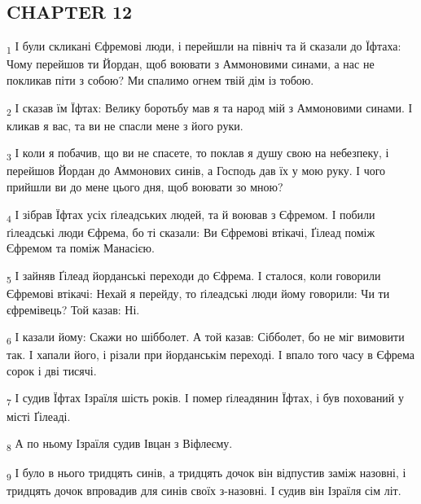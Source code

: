 \subsection{CHAPTER 12}
\begin{tcolorbox}
\textsubscript{1} І були скликані Єфремові люди, і перейшли на північ та й сказали до Їфтаха: Чому перейшов ти Йордан, щоб воювати з Аммоновими синами, а нас не покликав піти з собою? Ми спалимо огнем твій дім із тобою.
\end{tcolorbox}
\begin{tcolorbox}
\textsubscript{2} І сказав їм Їфтах: Велику боротьбу мав я та народ мій з Аммоновими синами. І кликав я вас, та ви не спасли мене з його руки.
\end{tcolorbox}
\begin{tcolorbox}
\textsubscript{3} І коли я побачив, що ви не спасете, то поклав я душу свою на небезпеку, і перейшов Йордан до Аммонових синів, а Господь дав їх у мою руку. І чого прийшли ви до мене цього дня, щоб воювати зо мною?
\end{tcolorbox}
\begin{tcolorbox}
\textsubscript{4} І зібрав Їфтах усіх ґілеадських людей, та й воював з Єфремом. І побили ґілеадські люди Єфрема, бо ті сказали: Ви Єфремові втікачі, Ґілеад поміж Єфремом та поміж Манасією.
\end{tcolorbox}
\begin{tcolorbox}
\textsubscript{5} І зайняв Ґілеад йорданські переходи до Єфрема. І сталося, коли говорили Єфремові втікачі: Нехай я перейду, то ґілеадські люди йому говорили: Чи ти єфремівець? Той казав: Ні.
\end{tcolorbox}
\begin{tcolorbox}
\textsubscript{6} І казали йому: Скажи но шібболет. А той казав: Сібболет, бо не міг вимовити так. І хапали його, і різали при йорданськім переході. І впало того часу в Єфрема сорок і дві тисячі.
\end{tcolorbox}
\begin{tcolorbox}
\textsubscript{7} І судив Їфтах Ізраїля шість років. І помер ґілеадянин Їфтах, і був похований у місті Ґілеаді.
\end{tcolorbox}
\begin{tcolorbox}
\textsubscript{8} А по ньому Ізраїля судив Івцан з Віфлеєму.
\end{tcolorbox}
\begin{tcolorbox}
\textsubscript{9} І було в нього тридцять синів, а тридцять дочок він відпустив заміж назовні, і тридцять дочок впровадив для синів своїх з-назовні. І судив він Ізраїля сім літ.
\end{tcolorbox}

